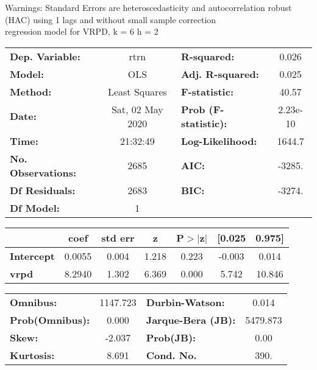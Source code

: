 Warnings: \newline
 [1] Standard Errors are heteroscedasticity and autocorrelation robust (HAC) using 1 lags and without small sample correction\\ 

regression model for VRPD, k = 6 h = 2\begin{center}
\begin{tabular}{lclc}
\toprule
\textbf{Dep. Variable:}    &       rtrn       & \textbf{  R-squared:         } &     0.026   \\
\textbf{Model:}            &       OLS        & \textbf{  Adj. R-squared:    } &     0.025   \\
\textbf{Method:}           &  Least Squares   & \textbf{  F-statistic:       } &     40.57   \\
\textbf{Date:}             & Sat, 02 May 2020 & \textbf{  Prob (F-statistic):} &  2.23e-10   \\
\textbf{Time:}             &     21:32:49     & \textbf{  Log-Likelihood:    } &    1644.7   \\
\textbf{No. Observations:} &        2685      & \textbf{  AIC:               } &    -3285.   \\
\textbf{Df Residuals:}     &        2683      & \textbf{  BIC:               } &    -3274.   \\
\textbf{Df Model:}         &           1      & \textbf{                     } &             \\
\bottomrule
\end{tabular}
\begin{tabular}{lcccccc}
                   & \textbf{coef} & \textbf{std err} & \textbf{z} & \textbf{P$> |$z$|$} & \textbf{[0.025} & \textbf{0.975]}  \\
\midrule
\textbf{Intercept} &       0.0055  &        0.004     &     1.218  &         0.223        &       -0.003    &        0.014     \\
\textbf{vrpd}      &       8.2940  &        1.302     &     6.369  &         0.000        &        5.742    &       10.846     \\
\bottomrule
\end{tabular}
\begin{tabular}{lclc}
\textbf{Omnibus:}       & 1147.723 & \textbf{  Durbin-Watson:     } &    0.014  \\
\textbf{Prob(Omnibus):} &   0.000  & \textbf{  Jarque-Bera (JB):  } & 5479.873  \\
\textbf{Skew:}          &  -2.037  & \textbf{  Prob(JB):          } &     0.00  \\
\textbf{Kurtosis:}      &   8.691  & \textbf{  Cond. No.          } &     390.  \\
\bottomrule
\end{tabular}
\end{center}

